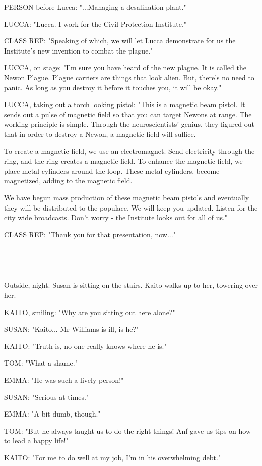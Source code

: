 \documentclass[11pt]{article}
\begin{document}
PERSON before Lucca: "...Managing a desalination plant."

LUCCA: "Lucca. I work for the Civil Protection Institute."

CLASS REP: "Speaking of which, we will let Lucca demonstrate for us the Institute's new invention to combat the plague."

LUCCA, on stage: "I'm sure you have heard of the new plague. 
It is called the Newon Plague.
Plague carriers are things that look alien. 
But, there's no need to panic.
As long as you destroy it before it touches you, it will be okay."

LUCCA, taking out a torch looking pistol: "This is a magnetic beam pistol.
It sends out a pulse of magnetic field so that you can target Newons at range.
The working principle is simple.
Through the neuroscientists' genius, they figured out that in order to destroy a Newon, a magnetic field will suffice.

To create a magnetic field, we use an electromagnet. 
Send electricity through the ring, and the ring creates a magnetic field.
To enhance the magnetic field, we place metal cylinders around the loop.
These metal cylinders, become magnetized, adding to the magnetic field.

We have begun mass production of these magnetic beam pistols and eventually they will be distributed to the populace.
We will keep you updated. 
Listen for the city wide broadcasts.
Don't worry - the Institute looks out for all of us."

CLASS REP: "Thank you for that presentation, now..."

\ 

\ 

Outside, night.
Susan is sitting on the stairs.
Kaito walks up to her, towering over her.

KAITO, smiling: "Why are you sitting out here alone?"

SUSAN: "Kaito...
Mr Williams is ill, is he?"

KAITO: "Truth is, no one really knows where he is."

TOM: "What a shame."

EMMA: "He was such a lively person!"

SUSAN: "Serious at times."

EMMA: "A bit dumb, though."

TOM: "But he always taught us to do the right things! 
Anf gave us tips on how to lead a happy life!"

KAITO: "For me to do well at my job, I'm in his overwhelming debt."
\end{document}
